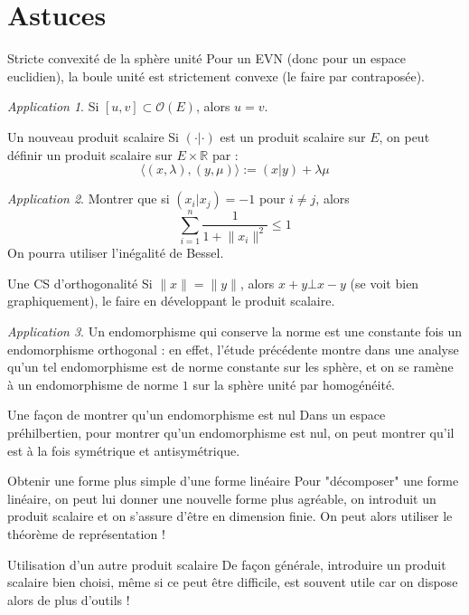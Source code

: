 \documentclass[french]{book}
\newcommand{\R}{\mathbb{R}}
\theoremstyle{plain}
\theoremstyle{definition}
\theoremstyle{remark}
\newtheorem*{app}{Application}
\begin{document}
\section{Astuces}
\begin{AS}{Stricte convexité de la sphère unité} Pour un EVN (donc pour un espace euclidien), la boule unité est strictement convexe (le faire par contraposée).
\end{AS} \begin{app} Si $[u,v]\subset\mathcal{O}(E)$, alors $u=v$.\end{app}
\begin{AS}{Un nouveau produit scalaire} Si $(\cdot|\cdot)$ est un produit scalaire sur $E$, on peut définir un produit scalaire sur $E\times\R$ par : $$\langle (x,\lambda),(y,\mu)\rangle:=(x|y)+\lambda\mu$$
\end{AS} \begin{app} Montrer que si $(x_i|x_j)=-1$ pour $i\ne j$, alors $$\sum_{i=1}^{n}\frac{1}{1+\lVert x_i\rVert^2}\leqslant 1$$ On pourra utiliser l'inégalité de Bessel. \end{app}
\begin{AS}{Une CS d'orthogonalité} Si $\lVert x\rVert=\lVert y\rVert$, alors $x+y\bot x-y$ (se voit bien graphiquement), le faire en développant le produit scalaire.
\end{AS} \begin{app} Un endomorphisme qui conserve la norme est une constante fois un endomorphisme orthogonal : en effet, l'étude précédente montre dans une analyse qu'un tel endomorphisme est de norme constante sur les sphère, et on se ramène à un endomorphisme de norme $1$ sur la sphère unité par homogénéité. \end{app}
\begin{AS}{Une façon de montrer qu'un endomorphisme est nul}
Dans un espace préhilbertien, pour montrer qu’un endomorphisme est nul, on
peut montrer qu’il est à la fois symétrique et antisymétrique.
\end{AS}
\begin{AS}{Obtenir une forme plus simple d'une forme linéaire} Pour "décomposer" une forme linéaire, on peut lui donner une nouvelle forme plus agréable, on introduit un produit scalaire et on s’assure d'être en dimension finie. On peut alors utiliser le théorème de représentation !
\end{AS}
\begin{AS}{Utilisation d'un autre produit scalaire} De façon générale, introduire un produit scalaire bien choisi, même si ce peut être difficile, est souvent utile car on dispose alors de plus d’outils !
\end{AS}
\end{document}
